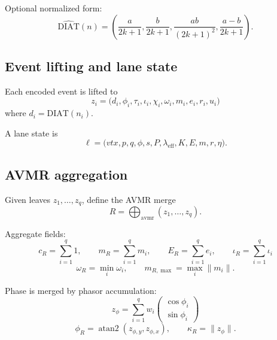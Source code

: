 \documentclass[11pt,a4paper]{article}
\begin{document}
Optional normalized form:
\begin{equation}
\widehat{\mathrm{DIAT}}(n)=
\left(
\frac{a}{2k+1},
\frac{b}{2k+1},
\frac{ab}{(2k+1)^2},
\frac{a-b}{2k+1}
\right).
\label{eq:diat_normalized}
\end{equation}

\subsection{Event lifting and lane state}

Each encoded event is lifted to
\begin{equation}
z_i=
\bigl(
d_i,\phi_i,\tau_i,\iota_i,\chi_i,\omega_i,m_i,e_i,r_i,u_i
\bigr)
\label{eq:event_lift}
\end{equation}
where $d_i=\mathrm{DIAT}(n_i)$.

A lane state is
\begin{equation}
\ell=
\bigl(
vtx,p,q,\phi,s,P,\lambda_{\mathrm{eff}},K,E,m,r,\eta
\bigr).
\label{eq:lane_state}
\end{equation}

\subsection{AVMR aggregation}

Given leaves $z_1,\dots,z_q$, define the AVMR merge
\begin{equation}
R=\bigoplus_{\mathrm{avmr}}(z_1,\dots,z_q).
\label{eq:avmr_merge}
\end{equation}

Aggregate fields:
\begin{equation}
c_R=\sum_{i=1}^{q}1,
\qquad
m_R=\sum_{i=1}^{q}m_i,
\qquad
E_R=\sum_{i=1}^{q}e_i,
\qquad
\iota_R=\sum_{i=1}^{q}\iota_i
\label{eq:avmr_basic_aggregates}
\end{equation}
\begin{equation}
\omega_R=\min_i \omega_i,
\qquad
m_{R,\max}=\max_i \|m_i\|.
\label{eq:avmr_extrema}
\end{equation}

Phase is merged by phasor accumulation:
\begin{equation}
z_{\phi}=\sum_{i=1}^{q}w_i
\begin{pmatrix}
\cos\phi_i\\
\sin\phi_i
\end{pmatrix}
\label{eq:phasor_sum}
\end{equation}
\begin{equation}
\phi_R=\operatorname{atan2}(z_{\phi,y},z_{\phi,x}),
\qquad
\kappa_R=\|z_\phi\|.
\label{eq:phase_merge}
\end{equation}
\end{document}
